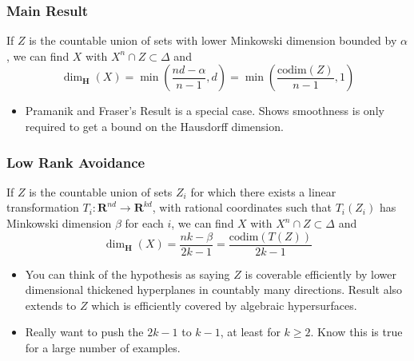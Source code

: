 \documentclass[usenames,dvipsnames]{beamer}
\begin{document}
\begin{frame}
    \frametitle{Main Result}

    \begin{theorem}
        If $Z$ is the countable union of sets with lower Minkowski dimension bounded by $\alpha$, we can find $X$ with $X^n \cap Z \subset \Delta$ and
        \[ \dim_{\mathbf{H}}(X) = \min \left( \frac{nd - \alpha}{n - 1}, d \right) = \min\left( \frac{\text{codim}(Z)}{n - 1}, 1 \right) \]
    \end{theorem}


    \begin{itemize}
        \item Pramanik and Fraser's Result is a special case. Shows smoothness is only required to get a bound on the Hausdorff dimension.
    \end{itemize}
\end{frame}

\begin{frame}
    \frametitle{Low Rank Avoidance}

    \begin{theorem}
        If $Z$ is the countable union of sets $Z_i$ for which there exists a linear transformation $T_i: \mathbf{R}^{nd} \to \mathbf{R}^{kd}$, with rational coordinates such that $T_i(Z_i)$ has Minkowski dimension $\beta$ for each $i$, we can find $X$ with $X^n \cap Z \subset \Delta$ and
        \[ \dim_{\mathbf{H}}(X) = \frac{nk - \beta}{2k - 1} = \frac{\text{codim}(T(Z))}{2k - 1} \]
    \end{theorem}

    \begin{itemize}
        \item You can think of the hypothesis as saying $Z$ is coverable efficiently by lower dimensional thickened hyperplanes in countably many directions. Result also extends to $Z$ which is efficiently covered by algebraic hypersurfaces.

        \item Really want to push the $2k - 1$ to $k - 1$, at least for $k \geq 2$. Know this is true for a large number of examples.
    \end{itemize}
\end{frame}
\end{document}
